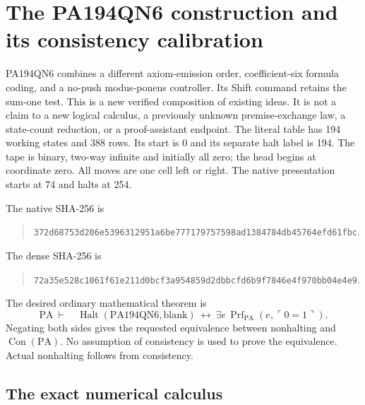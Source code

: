 \section{The PA194QN6 construction and its consistency calibration}
\label{sec:qn6}

PA194QN6 combines a different axiom-emission order, coefficient-six formula
coding, and a no-push modus-ponens controller. Its Shift command retains the
sum-one test. This is a new verified composition of existing ideas. It is
not a claim to a new logical calculus, a previously unknown premise-exchange
law, a state-count reduction, or a proof-assistant endpoint.
The literal table has 194 working states and 388 rows. Its start is 0 and
its separate halt label is 194. The tape is binary, two-way infinite and
initially all zero; the head begins at coordinate zero. All moves are one
cell left or right. The native presentation starts at 74 and halts at 254.

The native SHA-256 is
\begin{quote}\small\texttt{372d68753d206e5396312951a6be777179757598ad1384784db45764efd61fbc}.
\end{quote}
The dense SHA-256 is
\begin{quote}\small\texttt{72a35e528c1061f61e211d0bcf3a954859d2dbbcfd6b9f7846e4f970bb04e4e9}.
\end{quote}
The desired ordinary mathematical theorem is
\[
 \mathrm{PA}\ \vdash\quad
 \operatorname{Halt}(\mathrm{PA194QN6},\mathrm{blank})
 \ \longleftrightarrow\ 
 \exists e\,\operatorname{Prf}_{\mathrm{PA}}(e,\ulcorner0=1\urcorner).
 \tag{QN1}
\]
Negating both sides gives the requested equivalence between nonhalting and
$\operatorname{Con}(\mathrm{PA})$. No assumption of consistency is used to
prove the equivalence. Actual nonhalting follows from consistency.

\subsection{The exact numerical calculus}

